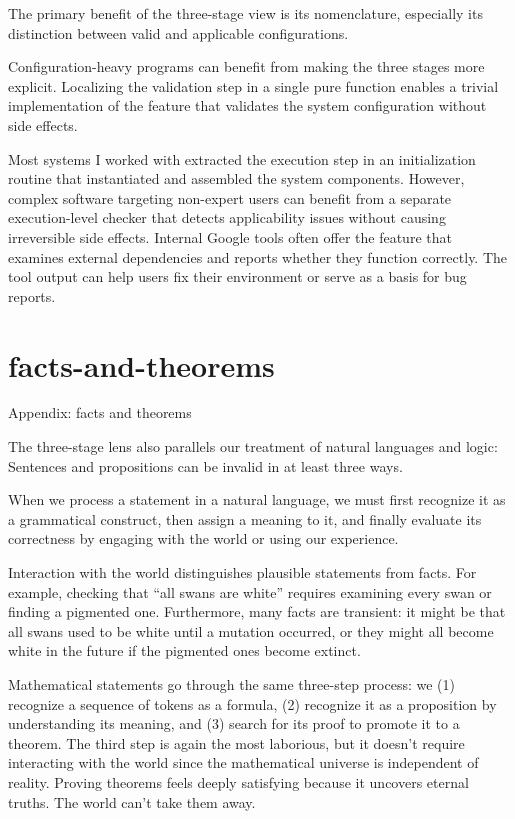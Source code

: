 \documentclass{article}
\begin{document}
The primary benefit of the three-stage view is its nomenclature,
especially its distinction between valid and applicable configurations.

Configuration-heavy programs can benefit from making the three stages more explicit.
Localizing the validation step in a single pure function enables a trivial implementation of the  feature
that validates the system configuration without side effects.

Most systems I worked with extracted the execution step in an initialization routine
that instantiated and assembled the system components.
However, complex software targeting non-expert users can benefit from a separate execution-level checker
that detects applicability issues without causing irreversible side effects.
Internal Google tools often offer the  feature
that examines external dependencies and reports whether they function correctly.
The tool output can help users fix their environment or serve as a basis for bug reports.

\section{facts-and-theorems}{Appendix: facts and theorems}

The three-stage lens also parallels our treatment of natural languages and logic:
Sentences and propositions can be invalid in at least three ways.

When we process a statement in a natural language,
we must first recognize it as a grammatical construct,
then assign a meaning to it,
and finally evaluate its correctness by engaging with the world or using our experience.

Interaction with the world distinguishes plausible statements from facts.
For example, checking that ``all swans are white'' requires examining every swan or finding a pigmented one.
Furthermore, many facts are transient: it might be that all swans used to be white until a mutation occurred,
or they might all become white in the future if the pigmented ones become extinct.

Mathematical statements go through the same three-step process:
we (1) recognize a sequence of tokens as a formula,
(2) recognize it as a proposition by understanding its meaning,
and (3) search for its proof to promote it to a theorem.
The third step is again the most laborious, but it doesn't require interacting with the world since the mathematical universe is independent of reality.
Proving theorems feels deeply satisfying because it uncovers eternal truths.
The world can't take them away.
\end{document}
